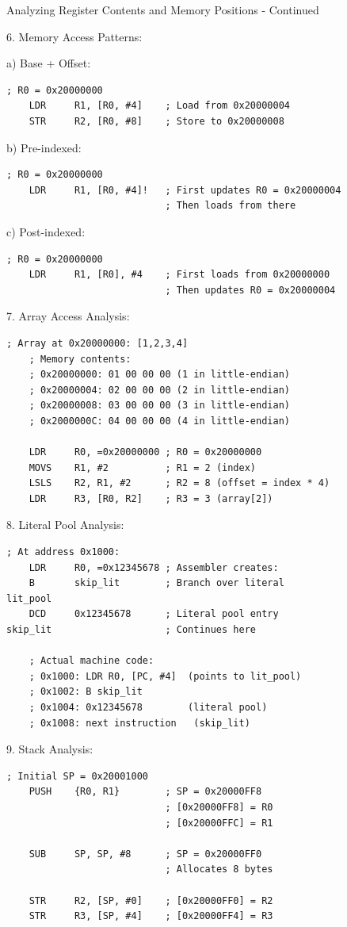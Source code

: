 \begin{KR}{Analyzing Register Contents and Memory Positions - Continued}

6. Memory Access Patterns:

a) Base + Offset:
\begin{lstlisting}[language=armasm, style=basesmol]
    ; R0 = 0x20000000
    LDR     R1, [R0, #4]    ; Load from 0x20000004
    STR     R2, [R0, #8]    ; Store to 0x20000008
\end{lstlisting}

b) Pre-indexed:
\begin{lstlisting}[language=armasm, style=basesmol]
    ; R0 = 0x20000000
    LDR     R1, [R0, #4]!   ; First updates R0 = 0x20000004
                            ; Then loads from there
\end{lstlisting}

c) Post-indexed:
\begin{lstlisting}[language=armasm, style=basesmol]
    ; R0 = 0x20000000
    LDR     R1, [R0], #4    ; First loads from 0x20000000
                            ; Then updates R0 = 0x20000004
\end{lstlisting}

7. Array Access Analysis:
\begin{lstlisting}[language=armasm, style=basesmol]
    ; Array at 0x20000000: [1,2,3,4]
    ; Memory contents:
    ; 0x20000000: 01 00 00 00 (1 in little-endian)
    ; 0x20000004: 02 00 00 00 (2 in little-endian)
    ; 0x20000008: 03 00 00 00 (3 in little-endian)
    ; 0x2000000C: 04 00 00 00 (4 in little-endian)
    
    LDR     R0, =0x20000000 ; R0 = 0x20000000
    MOVS    R1, #2          ; R1 = 2 (index)
    LSLS    R2, R1, #2      ; R2 = 8 (offset = index * 4)
    LDR     R3, [R0, R2]    ; R3 = 3 (array[2])
\end{lstlisting}

8. Literal Pool Analysis:
\begin{lstlisting}[language=armasm, style=basesmol]
    ; At address 0x1000:
    LDR     R0, =0x12345678 ; Assembler creates:
    B       skip_lit        ; Branch over literal
lit_pool
    DCD     0x12345678      ; Literal pool entry
skip_lit                    ; Continues here
    
    ; Actual machine code:
    ; 0x1000: LDR R0, [PC, #4]  (points to lit_pool)
    ; 0x1002: B skip_lit
    ; 0x1004: 0x12345678        (literal pool)
    ; 0x1008: next instruction   (skip_lit)
\end{lstlisting}

9. Stack Analysis:
\begin{lstlisting}[language=armasm, style=basesmol]
    ; Initial SP = 0x20001000
    PUSH    {R0, R1}        ; SP = 0x20000FF8
                            ; [0x20000FF8] = R0
                            ; [0x20000FFC] = R1
    
    SUB     SP, SP, #8      ; SP = 0x20000FF0
                            ; Allocates 8 bytes
    
    STR     R2, [SP, #0]    ; [0x20000FF0] = R2
    STR     R3, [SP, #4]    ; [0x20000FF4] = R3
\end{lstlisting}
\end{KR}



